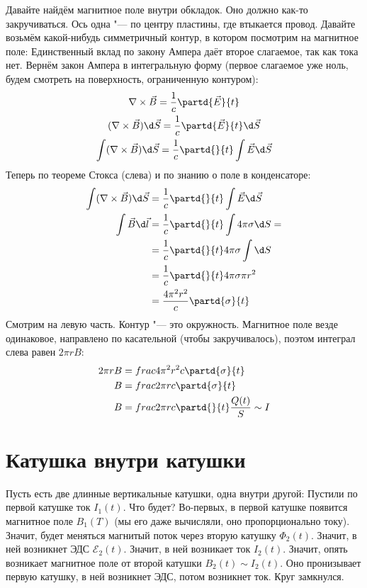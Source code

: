 	Давайте найдём магнитное поле внутри обкладок.
	Оно должно как-то закручиваться.
	Ось одна "--- по центру пластины, где втыкается провод.
	Давайте возьмём какой-нибудь симметричный контур, в котором посмотрим на магнитное поле:
	Единственный вклад по закону Ампера даёт второе слагаемое, так как тока нет.
	Вернём закон Ампера в интегральную форму (первое слагаемое уже ноль, будем смотреть на поверхность, ограниченную контуром):
	\begin{gather*}
		\nabla \times \vec B = \frac 1c \partd{\vec E}{t} \\
		(\nabla \times \vec B) \d \vec S = \frac 1c \partd{\vec E}{t} \d \vec S \\
		\int (\nabla \times \vec B) \d \vec S = \frac 1c \partd{}{t} \int \vec E \d \vec S \\
	\end{gather*}
	Теперь по теореме Стокса (слева) и по знанию о поле в конденсаторе:
	\begin{align*}
		\int (\nabla \times \vec B) \d \vec S &= \frac 1c \partd{}{t} \int \vec E \d \vec S \\
		\int \vec B \d \vec l &= \frac 1c \partd{}{t} \int 4\pi\sigma \d S =\\
			&= \frac 1c \partd{}{t} 4\pi\sigma \int \d S \\
			&= \frac 1c \partd{}{t} 4\pi\sigma \pi r^2 \\
			&= \frac{4\pi^2r^2}c \partd{\sigma}{t} \\
	\end{align*}
	Смотрим на левую часть.
	Контур "--- это окружность.
	Магнитное поле везде одинаковое, направлено по касательной (чтобы закручивалось),
	поэтом интеграл слева равен $2 \pi r B$:
	\begin{align*}
		2\pi r B &= frac{4\pi^2r^2}c \partd{\sigma}{t} \\
		B &= frac{2\pi r}c \partd{\sigma}{t} \\
		B &= frac{2\pi r}c \partd{}{t} \frac{Q(t)}{S} \sim I \\
	\end{align*}

\section{Катушка внутри катушки}
	Пусть есть две длинные вертикальные катушки, одна внутри другой:
	Пустили по первой катушке ток $I_1(t)$.
	Что будет?
	Во-первых, в первой катушке появится магнитное поле $B_1(T)$ (мы его даже вычисляли, оно пропорционально току).
	Значит, будет меняться магнитый поток через вторую катушку $\Phi_2(t)$.
	Значит, в ней возникнет ЭДС $\mathcal{E}_2(t)$.
	Значит, в ней возникает ток $I_2(t)$.
	Значит, опять возникает магнитное поле от второй катушки $B_2(t) \sim I_2(t)$.
	Оно пронизывает первую катушку, в ней возникнет ЭДС, потом возникнет ток.
	Круг замкнулся.

